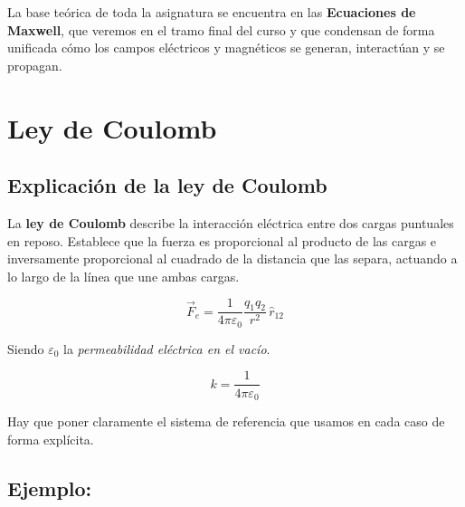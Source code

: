\documentclass[a4paper,12pt]{article}
\begin{document}
La base teórica de toda la asignatura se encuentra en las \textbf{Ecuaciones de Maxwell}, que veremos en el tramo final del curso y que condensan de forma unificada cómo los campos eléctricos y magnéticos se generan, interactúan y se propagan.

\newpage

\section{Ley de Coulomb}

\subsection*{Explicación de la ley de Coulomb}

La \textbf{ley de Coulomb} describe la interacción eléctrica entre dos cargas puntuales en reposo. 
Establece que la fuerza es proporcional al producto de las cargas e inversamente proporcional al cuadrado de la distancia que las separa, 
actuando a lo largo de la línea que une ambas cargas.

\[
\vec{F}_e = \frac{1}{4\pi\varepsilon_0} \frac{q_1 q_2}{r^2} \, \hat{r}_{12}
\]

Siendo $\varepsilon_0$ la \textit{permeabilidad eléctrica en el vacío}.

\[
k = \frac{1}{4\pi\varepsilon_0}
\]

Hay que poner claramente el sistema de referencia que usamos en cada caso de forma explícita.  

\subsection*{Ejemplo:}

\begin{center}
\end{center}
\end{document}
